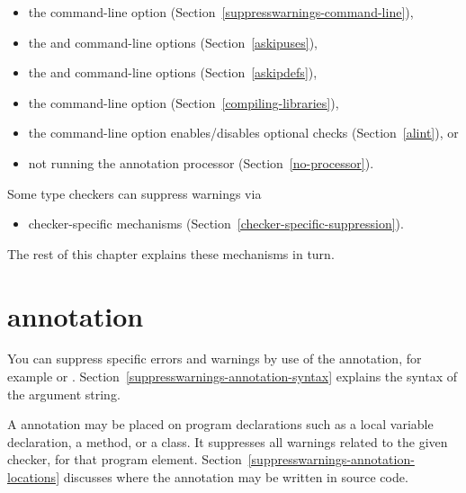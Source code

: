 \begin{itemize}
\item
  the  command-line option (Section~\ref{suppresswarnings-command-line}),
\item
  the  and  command-line options (Section~\ref{askipuses}),
\item
  the  and  command-line options (Section~\ref{askipdefs}),
\item
  the  command-line
  option (Section~\ref{compiling-libraries}),
\item
  the  command-line option enables/disables optional checks (Section~\ref{alint}), or
\item
  not running the annotation processor
  (Section~\ref{no-processor}).
\end{itemize}

Some type checkers can suppress warnings via
\begin{itemize}
\item
  checker-specific mechanisms (Section~\ref{checker-specific-suppression}).
\end{itemize}

\noindent
The rest of this chapter explains these mechanisms in turn.


\section{ annotation\label{suppresswarnings-annotation}}

\begin{sloppypar}
You can suppress specific errors and warnings by use of the
 annotation, for example
 or .
Section~\ref{suppresswarnings-annotation-syntax} explains the syntax of the
argument string.
\end{sloppypar}

A 
annotation may be placed on program declarations such as a local
variable declaration, a method, or a class.  It suppresses all warnings
related to the given checker, for that program element.
Section~\ref{suppresswarnings-annotation-locations} discusses where the
annotation may be written in source code.

